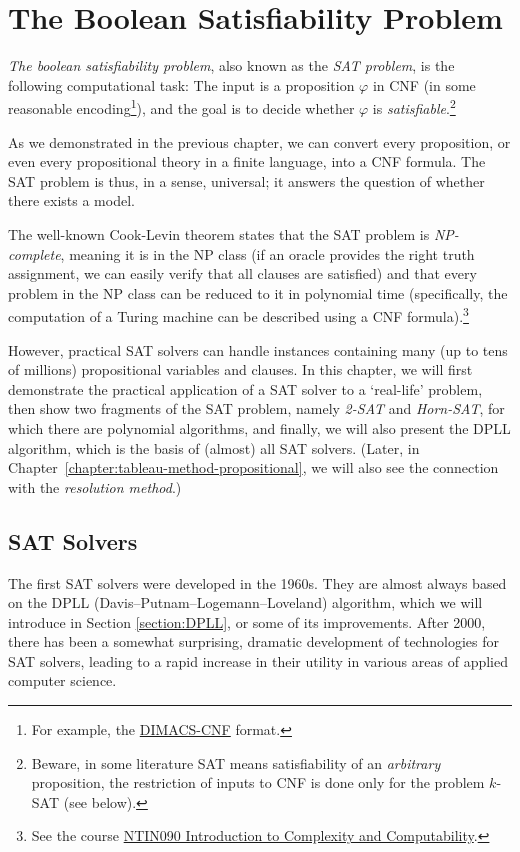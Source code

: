 \chapter{The Boolean Satisfiability Problem}

\emph{The boolean satisfiability problem}, also known as the \emph{SAT problem}, is the following computational task: The input is a proposition $\varphi$ in CNF (in some reasonable encoding\footnote{For example, the \href{http://people.sc.fsu.edu/~jburkardt/data/cnf/cnf.html}{DIMACS-CNF} format.}), and the goal is to decide whether $\varphi$ is \emph{satisfiable}.\footnote{Beware, in some literature SAT means satisfiability of an \emph{arbitrary} proposition, the restriction of inputs to CNF is done only for the problem $k$-SAT (see below).}

As we demonstrated in the previous chapter, we can convert every proposition, or even every propositional theory in a finite language, into a CNF formula. The SAT problem is thus, in a sense, universal; it answers the question of whether there exists a model.

The well-known Cook-Levin theorem states that the SAT problem is \emph{NP-complete}, meaning it is in the NP class (if an oracle provides the right truth assignment, we can easily verify that all clauses are satisfied) and that every problem in the NP class can be reduced to it in polynomial time (specifically, the computation of a Turing machine can be described using a CNF formula).\footnote{See the course \href{https://is.cuni.cz/studium/predmety/index.php?do=predmet&kod=NTIN090}{NTIN090 Introduction to Complexity and Computability}.}

However, practical SAT solvers can handle instances containing many (up to tens of millions) propositional variables and clauses. In this chapter, we will first demonstrate the practical application of a SAT solver to a `real-life' problem, then show two fragments of the SAT problem, namely \emph{2-SAT} and \emph{Horn-SAT}, for which there are polynomial algorithms, and finally, we will also present the DPLL algorithm, which is the basis of (almost) all SAT solvers. (Later, in Chapter~\ref{chapter:tableau-method-propositional}, we will also see the connection with the \emph{resolution method}.)

\section{SAT Solvers}

The first SAT solvers were developed in the 1960s. They are almost always based on the DPLL (Davis–Putnam–Logemann–Loveland) algorithm, which we will introduce in Section \ref{section:DPLL}, or some of its improvements. After 2000, there has been a somewhat surprising, dramatic development of technologies for SAT solvers, leading to a rapid increase in their utility in various areas of applied computer science.

